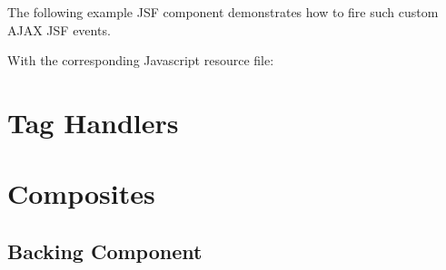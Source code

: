 The following example JSF component demonstrates how to fire such custom AJAX JSF events.


With the corresponding Javascript resource file:


\section{Tag Handlers}

\section{Composites}

\subsection{Backing Component}